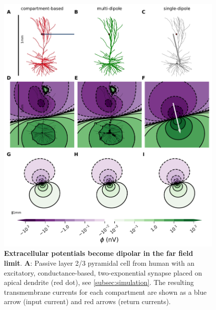 \documentclass[preprint,10pt,authoryear]{elsarticle}
\begin{document}
	
\begin{figure}[H]
	\centering
	\includegraphics[width=1.0\textwidth]{fig_dipole_field_passiveTrue_single_syn481}
	\caption{\textbf{Extracellular potentials become dipolar in the far field limit}. 
		\textbf{A}: Passive layer 2/3 pyramidal cell from human \citep{EYAL2016} with an excitatory, conductance-based, two-exponential synapse placed on apical dendrite (red dot), see \ref{subsec:simulation}. The resulting transmembrane currents for each compartment are shown as a blue arrow (input current) and red arrows (return currents).
}
\end{figure}
\end{document}
